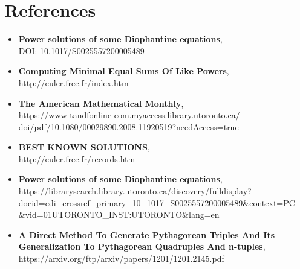 \documentclass{article}
\begin{document}
\section{References}
\begin{itemize}
    \item {\bf Power solutions of some Diophantine equations}, \\
    DOI: 10.1017/S0025557200005489
    \item {\bf Computing Minimal Equal Sums Of Like Powers}, \\
    http://euler.free.fr/index.htm
    \item {\bf The American Mathematical Monthly}, \\
    https://www-tandfonline-com.myaccess.library.utoronto.ca/ \\
    doi/pdf/10.1080/00029890.2008.11920519?needAccess=true
    \item {\bf BEST KNOWN SOLUTIONS}, \\
    http://euler.free.fr/records.htm
    \item {\bf Power solutions of some Diophantine equations}, \\
    https://librarysearch.library.utoronto.ca/discovery/fulldisplay?\\
    docid=cdi\_crossref\_primary\_10\_1017\_S0025557200005489\&context=PC\\
    \&vid=01UTORONTO\_INST:UTORONTO\&lang=en
    \item {\bf A Direct Method To Generate Pythagorean Triples And Its Generalization To Pythagorean Quadruples And n-tuples},\\ 
    https://arxiv.org/ftp/arxiv/papers/1201/1201.2145.pdf
\end{itemize}
\end{document}
